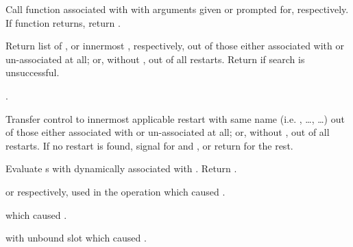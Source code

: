 \begin{LIST}{1cm}
  {
  Call function associated with  with arguments given or
  prompted for, respectively. If  function returns,
  return .
  }

  {
  Return list of , or innermost 
  , respectively, out of those either associated
  with  or un-associated at all; or, without
  , out of all restarts. Return \retval{\NIL} if search
  is unsuccessful.
  }

  {
  .
  }

  {
  Transfer control to innermost applicable restart with same name
  (i.e. , \ldots,  \ldots) out of those either associated
  with  or un-associated at all; or, without
  , out of all restarts. If no restart is found,
  signal  for  and ,
  or return \retval{\NIL} for the rest.
  }

  {
  Evaluate s with 
  dynamically associated with . Return . 
  }

  {
   or  respectively,
  used in the operation which caused .
  }

  {
   which caused .
  }

  {
   with unbound slot which caused .
  }


\end{LIST}

